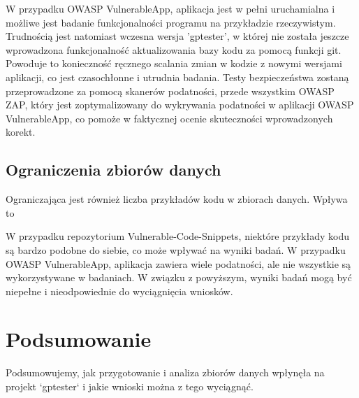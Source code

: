 W przypadku OWASP VulnerableApp, aplikacja jest w pełni uruchamialna i możliwe jest badanie funkcjonalności programu na przykładzie rzeczywistym. Trudnością jest natomiast wczesna wersja 'gptester', w której nie została jeszcze wprowadzona funkcjonalność aktualizowania bazy kodu za pomocą funkcji git. Powoduje to konieczność ręcznego scalania zmian w kodzie z nowymi wersjami aplikacji, co jest czasochłonne i utrudnia badania. Testy bezpieczeństwa zostaną przeprowadzone za pomocą skanerów podatności, przede wszystkim OWASP ZAP, który jest zoptymalizowany do wykrywania podatności w aplikacji OWASP VulnerableApp, co pomoże w faktycznej ocenie skuteczności wprowadzonych korekt.

\subsection{Ograniczenia zbiorów danych}
Ograniczająca jest również liczba przykładów kodu w zbiorach danych. Wpływa to 

W przypadku repozytorium Vulnerable-Code-Snippets, niektóre przykłady kodu są bardzo podobne do siebie, co może wpływać na wyniki badań. W przypadku OWASP VulnerableApp, aplikacja zawiera wiele podatności, ale nie wszystkie są wykorzystywane w badaniach. W związku z powyższym, wyniki badań mogą być niepełne i nieodpowiednie do wyciągnięcia wniosków.

\section{Podsumowanie}
Podsumowujemy, jak przygotowanie i analiza zbiorów danych wpłynęła na projekt `gptester` i jakie wnioski można z tego wyciągnąć.

